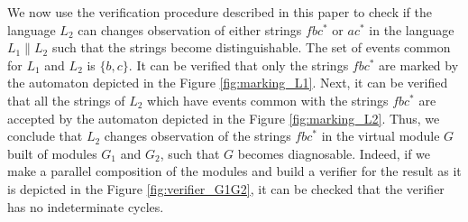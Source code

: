 \documentclass[letterpaper, 10pt, conference]{ieeeconf}
\begin{document}
We now use the verification procedure described in this paper to check if the
language $L_2$ can changes observation of either strings $fbc^*$ or
$ac^*$ in the language $L_1 \parallel L_2$ such that the strings become
distinguishable. The set of events common for $L_1$ and $L_2$ is $\{b, c\}$. It
can be verified that only the strings $fbc^*$ are marked by the automaton
depicted in the Figure \ref{fig:marking_L1}. Next, it can be verified that all
the strings of $L_2$ which have events common with the strings $fbc^*$ are
accepted by the automaton depicted in the Figure \ref{fig:marking_L2}. Thus, we
conclude that $L_2$ changes observation of the strings $fbc^*$ in the virtual
module $G$ built of modules $G_1$ and $G_2$, such that $G$ becomes diagnosable.
Indeed, if we make a parallel composition of the modules and build a verifier
for the result as it is depicted in the Figure \ref{fig:verifier_G1G2}, it can
be checked that the verifier has no indeterminate cycles.


 
% 
% 
\end{document}
